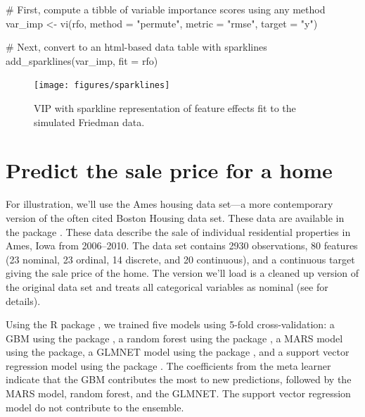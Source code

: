 \begin{example}
# First, compute a tibble of variable importance scores using any method
var_imp <- vi(rfo, method = "permute", metric = "rmse", target = "y")

# Next, convert to an html-based data table with sparklines
add_sparklines(var_imp, fit = rfo)
\end{example}

\begin{figure}[!htb]
  \centering 
  \texttt{[image: figures/sparklines]} 
  \caption{VIP with sparkline representation of feature effects fit to the simulated Friedman data.}
  \label{fig:sparklines}
\end{figure}


\section{Predict the sale price for a home}

For illustration, we'll use the Ames housing data set---a more contemporary version of the often cited Boston Housing data set. These data are available in the  package \citep{AmesHousing-pkg}. These data describe the sale of individual residential properties in Ames, Iowa from 2006--2010. The data set contains 2930 observations, 80 features (23 nominal, 23 ordinal, 14 discrete, and 20 continuous), and a continuous target giving the sale price of the home. The version we'll load is a cleaned up version of the original data set and treats all categorical variables as nominal (see  for details).

Using the R package  \citep{SuperLearner-pkg}, we trained five models using 5-fold cross-validation: a GBM using the  package \citep{xgboost-pkg}, a random forest using the  package \citep{ranger-pkg}, a MARS model using the  \citep{earth-pkg} package, a GLMNET model using the  package \citep{glmnet-pkg}, and a support vector regression model using the  package \citep{kernlab-pkg}. The coefficients from the meta learner indicate that the GBM contributes the most to new predictions, followed by the MARS model, random forest, and the GLMNET. The support vector regression model do not contribute to the ensemble.

